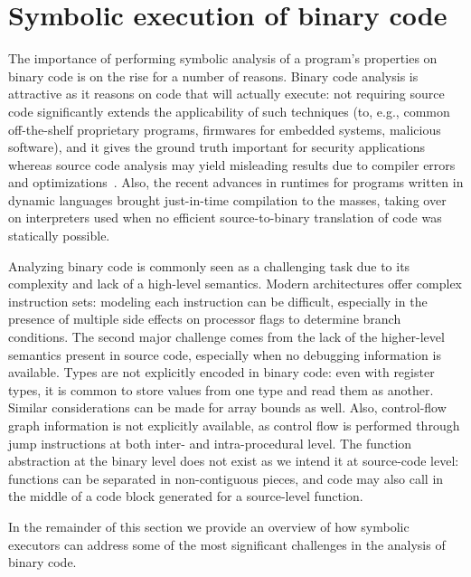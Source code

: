 
\section{Symbolic execution of binary code}

The importance of performing symbolic analysis of a program's properties on binary code is on the rise for a number of reasons. Binary code analysis is attractive as it reasons on code that will actually execute: not requiring source code significantly extends the applicability of such techniques (to, e.g., common off-the-shelf proprietary programs, firmwares for embedded systems, malicious software), and it gives the ground truth important for security applications whereas source code analysis may yield misleading results due to compiler errors and optimizations~\cite{BITBLAZE-ICISS08}. Also, the recent advances in runtimes for programs written in dynamic languages brought just-in-time compilation to the masses, taking over on interpreters used when no efficient source-to-binary translation of code was statically possible. 

Analyzing binary code is commonly seen as a challenging task due to its complexity and lack of a high-level semantics. Modern architectures offer complex instruction sets: modeling each instruction can be difficult, especially in the presence of multiple side effects on processor flags to determine branch conditions. The second major challenge comes from the lack of the higher-level semantics present in source code, especially when no debugging information is available. Types are not explicitly encoded in binary code: even with register types, it is common to store values from one type and read them as another. Similar considerations can be made for array bounds as well. Also, control-flow graph information is not explicitly available, as control flow is performed through jump instructions at both inter- and intra-procedural level. The function abstraction at the binary level does not exist as we intend it at source-code level: functions can be separated in non-contiguous pieces, and code may also call in the middle of a code block generated for a source-level function.

In the remainder of this section we provide an overview of how symbolic executors can address some of the most significant challenges in the analysis of binary code.

